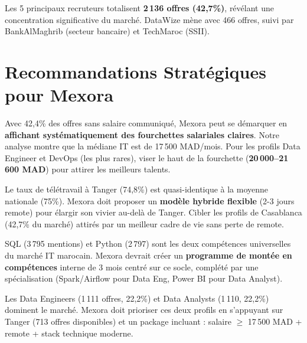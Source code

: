 \documentclass[12pt,a4paper]{article}
\begin{document}
Les 5 principaux recruteurs totalisent \textbf{2\,136 offres (42,7\%)}, révélant une concentration significative du marché. DataWize mène avec 466 offres, suivi par BankAlMaghrib (secteur bancaire) et TechMaroc (SSII).

\section{Recommandations Stratégiques pour Mexora}

\begin{recobox}
Avec 42,4\% des offres sans salaire communiqué, Mexora peut se démarquer en \textbf{affichant systématiquement des fourchettes salariales claires}. Notre analyse montre que la médiane IT est de 17\,500 MAD/mois. Pour les profils Data Engineer et DevOps (les plus rares), viser le haut de la fourchette (\textbf{20\,000--21\,600 MAD}) pour attirer les meilleurs talents.
\end{recobox}

\begin{recobox}
Le taux de télétravail à Tanger (74,8\%) est quasi-identique à la moyenne nationale (75\%). Mexora doit proposer un \textbf{modèle hybride flexible} (2-3 jours remote) pour élargir son vivier au-delà de Tanger. Cibler les profils de Casablanca (42,7\% du marché) attirés par un meilleur cadre de vie sans perte de remote.
\end{recobox}

\begin{recobox}
SQL (3\,795 mentions) et Python (2\,797) sont les deux compétences universelles du marché IT marocain. Mexora devrait créer un \textbf{programme de montée en compétences} interne de 3 mois centré sur ce socle, complété par une spécialisation (Spark/Airflow pour Data Eng, Power BI pour Data Analyst).
\end{recobox}

\begin{recobox}
Les Data Engineers (1\,111 offres, 22,2\%) et Data Analysts (1\,110, 22,2\%) dominent le marché. Mexora doit prioriser ces deux profils en s'appuyant sur Tanger (713 offres disponibles) et un package incluant : salaire $\geq$ 17\,500 MAD + remote + stack technique moderne.
\end{recobox}
\end{document}
